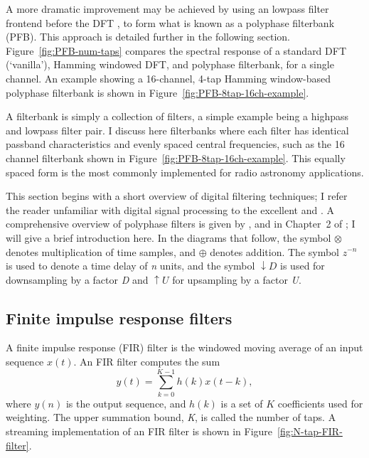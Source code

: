 \documentclass{ws-rv961x669}
\begin{document}
A more dramatic improvement may be achieved by using an lowpass filter frontend before the DFT \citep{Bellanger:1976p7898}, to form what is known as a polyphase filterbank (PFB). This approach is detailed further in the following section. Figure~\ref{fig:PFB-num-taps} compares the spectral response of a standard DFT (`vanilla'), Hamming windowed DFT, and polyphase filterbank, for a single channel. An example showing a 16-channel, 4-tap Hamming window-based polyphase filterbank is shown in Figure~\ref{fig:PFB-8tap-16ch-example}.

A filterbank is simply a collection of filters, a simple example being a highpass and lowpass filter pair. I discuss here filterbanks where each filter has identical passband characteristics and evenly spaced central frequencies, such as the 16 channel filterbank shown in Figure~\ref{fig:PFB-8tap-16ch-example}. This equally spaced form is the most commonly implemented for radio astronomy applications. 

This section begins with a short overview of digital filtering techniques; I refer the reader unfamiliar with digital signal processing to the excellent \citet{bookLyonsDSP} and \citet{BookSmithDSP}. A comprehensive overview of polyphase filters is given by \citet{Vaidyanathan:1990p6127}, and in Chapter~2 of \citet{BookHarrisMultirateDSP}; I will give a brief introduction here. In the diagrams that follow, the symbol $\otimes$ denotes multiplication of time samples, and $\oplus$ denotes addition. The symbol $z^{-n}$ is used to denote a time delay of \emph{n} units, and the symbol $\downarrow D$ is used for downsampling by a factor \emph{D} and $\uparrow U$ for upsampling by a factor \emph{U}.



\subsection{Finite impulse response filters}

A finite impulse response (FIR) filter is the windowed moving average of an input sequence $x(t)$. An FIR filter computes the sum 
\begin{equation} 
y(t)=\sum_{k=0}^{K-1}h(k)x(t-k),\label{eq:FIR-filter}
\end{equation}
where $y(n)$ is the output sequence, and $h(k)$ is a set of $K$ coefficients used for weighting. The upper summation bound, \emph{K}, is called the number of taps.\emph{ }A streaming implementation of an FIR filter is shown in Figure~\ref{fig:N-tap-FIR-filter}.
\end{document}
